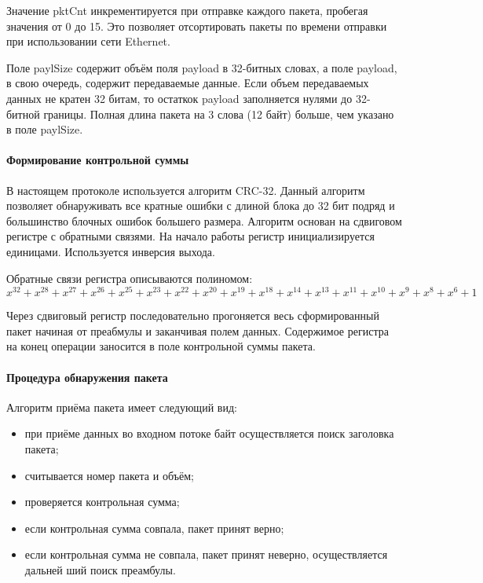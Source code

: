 Значение pktCnt инкрементируется при отправке каждого пакета, пробегая значения от
0 до 15. Это позволяет отсортировать пакеты по времени отправки при использовании сети
Ethernet.

Поле paylSize содержит объём поля payload в 32-битных словах, а поле payload, в свою очередь, содержит
передаваемые данные. Если объем передаваемых данных не кратен 32 битам, то остаткок
payload заполняется нулями до 32-битной границы. Полная длина пакета на 3 слова (12 байт)
больше, чем указано в поле paylSize.

\paragraph{Формирование контрольной суммы}

В настоящем протоколе используется алгоритм CRC-32. Данный алгоритм позволяет
обнаруживать все кратные ошибки с длиной блока до 32 бит подряд и большинство блочных
ошибок большего размера. Алгоритм основан на сдвиговом регистре с обратными связями.
На начало работы регистр инициализируется единицами. Используется инверсия выхода.

Обратные связи регистра описываются полиномом:
\begin{equation}
	x^{32}+x^{28}+x^{27}+x^{26}+x^{25}+x^{23}+x^{22}+x^{20}+x^{19}+x^{18}+x^{14}+x^{13}+x^{11}+x^{10}+x^{9}+x^{8}+x^{6}+1
\end{equation}

Через сдвиговый регистр последовательно прогоняется весь сформированный пакет
начиная от преабмулы и заканчивая полем данных. Содержимое регистра на конец операции
заносится в поле контрольной суммы пакета.

\hypertarget{algorythm}{\paragraph{Процедура обнаружения пакета}}

Алгоритм приёма пакета имеет следующий вид:
\begin{itemize}
	\item при приёме данных во входном потоке байт осуществляется поиск заголовка пакета;
	\item считывается номер пакета и объём;
	\item проверяется контрольная сумма;
	\item если контрольная сумма совпала, пакет принят верно;
	\item если контрольная сумма не совпала, пакет принят неверно, осуществляется дальней­
	ший поиск преамбулы.
\end{itemize}

